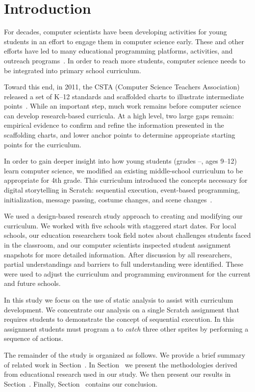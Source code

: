 \section{Introduction}
For decades, computer scientists have been developing activities for young
students in an effort to engage them in computer science early. These and other
efforts have led to many educational programming platforms, activities, and
outreach programs~\cite{wayanoutpost, georgiaoutreach,
  Franklin:2011:ATA:1953163.1953295, Maloney:2010:SPL:1868358.1868363,
  Dann:2000:MCP:343048.343070, Hood:2005:TPL:1067445.1067454, csunplugged}. In
order to reach more students, computer science needs to be integrated into
primary school curriculum.

Toward this end, in 2011, the CSTA (Computer Science Teachers Association)
released a set of K--12 standards and scaffolded charts to illustrate
intermediate points~\cite{cstastandards}. While an important step, much work
remains before computer science can develop research-based curricula. At a high
level, two large gaps remain: empirical evidence to confirm and refine the
information presented in the scaffolding charts, and lower anchor points to
determine appropriate starting points for the curriculum.

In order to gain deeper insight into how young students (grades
--, ages 9--12) learn computer science, we modified an existing
middle-school curriculum to be appropriate for 4th grade. This curriculum
introduced the concepts necessary for digital storytelling in Scratch:
sequential execution, event-based programming, initialization, message passing,
costume changes, and scene changes~\cite{Franklin:2013:SBO}.

We used a design-based research study approach to creating and modifying our
curriculum. We worked with five schools with staggered start dates. For local
schools, our education researchers took field notes about challenges students
faced in the classroom, and our computer scientists inspected student
assignment snapshots for more detailed information. After discussion by all
researchers, partial understandings and barriers to full understanding were
identified. These were used to adjust the curriculum and programming
environment for the current and future schools.

In this study we focus on the use of static analysis to assist with curriculum
development. We concentrate our analysis on a single Scratch assignment that
requires students to demonstrate the concept of sequential execution. In this
assignment students must program a \net{} to \emph{catch} three other sprites
by performing a sequence of actions.

The remainder of the study is organized as follows. We provide a brief summary
of related work in Section~. In
Section~ we present the methodologies derived from
educational research used in our study. We then present our results in
Section~. Finally, Section~
contains our conclusion.
